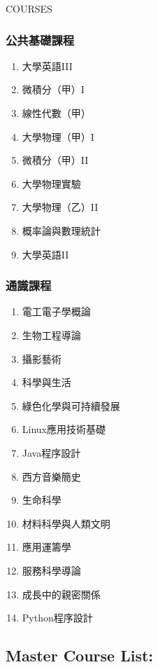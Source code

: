 \documentclass{resume}
\begin{document}
\begin{rSection}{COURSES}
\begin{minipage}[t]{0.31\textwidth}
    \subsubsection*{公共基礎課程}
    \begin{enumerate}
        \item 大學英語III
        \item 微積分（甲）I
        \item 線性代數（甲）
        \item 大學物理（甲）I
        \item 微積分（甲）II
        \item 大學物理實驗
        \item 大學物理（乙）II
        \item 概率論與數理統計
        \item 大學英語II
    \end{enumerate}
\end{minipage}\hfill
\begin{minipage}[t]{0.31\textwidth}
    \subsubsection*{通識課程}
    \begin{enumerate}
        \item 電工電子學概論
        \item 生物工程導論
        \item 攝影藝術
        \item 科學與生活
        \item 綠色化學與可持續發展
        \item Linux應用技術基礎
        \item Java程序設計
        \item 西方音樂簡史
        \item 生命科學
        \item 材料科學與人類文明
        \item 應用運籌學
        \item 服務科學導論
        \item 成長中的親密關係
        \item Python程序設計
    \end{enumerate}
\end{minipage}

\newpage

\vspace{-1em}
\subsection*{Master Course List:}


\end{rSection}
\end{document}
